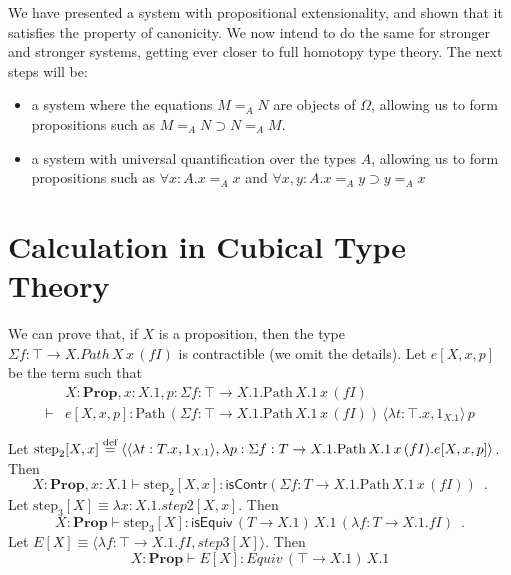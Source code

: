 \documentclass[a4paper,UKenglish]{lipics-v2016}
\newcommand*{\eqdef}{\mathrel{\smash{\stackrel{\text{def}}{=}}}}
\newcommand{\Path}[3]{\ensuremath{\mathrm{Path} \, {#1} \, {#2} \, {#3}}}
\newcommand{\Prop}{\mathbf{Prop}}
\theoremstyle{plain}
\theoremstyle{definition}
\begin{document}
We have presented a system with propositional extensionality, and shown that it satisfies the property of canonicity.
We now intend to do the same for stronger and stronger systems, getting
ever closer to full homotopy type theory.  The next steps will be:

\begin{itemize}
\item
a system where the equations $M =_A N$ are objects of $\Omega$, allowing us to form propositions such as $M =_A N \supset N =_A M$.
\item
a system with universal quantification over the types $A$, allowing us to form propositions such as $\forall x:A. x =_A x$ and
$\forall x,y : A. x =_A y \supset y =_A x$
\end{itemize}



\appendix

\section{Calculation in Cubical Type Theory}
\label{appendix:cubical}

\newcommand{\steptwo}{\mathrm{step}_2}
\newcommand{\stepthree}{\mathrm{step}_3}

We can prove that, if $X$ is a proposition, then the type $\Sigma f:\top \rightarrow X. Path \, X \, x \, (f I)$ is contractible (we omit the details).  Let $e[X, x, p]$ be the term such that
\begin{align*} & X : \Prop, x : X.1, p : \Sigma f:\top \rightarrow X.1. \Path{X.1}{x}{(fI)} \\
\vdash & e[X, x, p] : \Path{(\Sigma f:\top \rightarrow X.1. \Path{X.1}{x}{(f I)})}{\langle \lambda t : \top . x, 1_{X.1} \rangle}{p}
\end{align*}

Let $\steptwo [X,x] \eqdef \langle \langle \lambda t : T.x, 1_{X.1} \rangle,
\lambda p : \Sigma f : T \rightarrow X.1. \Path{X.1}{x}{(fI)}. e[X, x, p] \rangle$.  Then
$$ X : \Prop, x : X.1 \vdash \steptwo [X, x] : \mathsf{isContr}(\Sigma f:T \rightarrow X.1. \Path{X.1}{x}{(fI)}) \enspace . $$
Let $\stepthree [X] \equiv \lambda x : X.1. step2[X, x]$.  Then
$$ X : \Prop \vdash \stepthree [X] : \mathsf{isEquiv} \, (T \rightarrow X.1) \, X.1 \, (\lambda f : T \rightarrow X.1. f I) \enspace . $$
Let $E[X] \equiv \langle \lambda f : \top \rightarrow X.1. f I, step3[X] \rangle$.  Then
$$ X : \Prop \vdash E[X] : Equiv \, (\top \rightarrow X.1) \, X.1 $$
\end{document}
